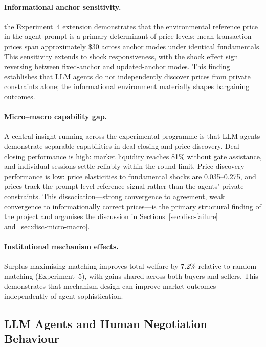 \paragraph{Informational anchor sensitivity.}
the Experiment~4 extension demonstrates that the environmental reference price in the agent prompt is a primary determinant of price levels: mean transaction prices span approximately \$30 across anchor modes under identical fundamentals.  This sensitivity extends to shock responsiveness, with the shock effect sign reversing between fixed-anchor and updated-anchor modes.  This finding establishes that LLM agents do not independently discover prices from private constraints alone; the informational environment materially shapes bargaining outcomes.

\paragraph{Micro--macro capability gap.}
A central insight running across the experimental programme is that LLM agents demonstrate separable capabilities in deal-closing and price-discovery.  Deal-closing performance is high: market liquidity reaches 81\% without gate assistance, and individual sessions settle reliably within the round limit.  Price-discovery performance is low: price elasticities to fundamental shocks are 0.035--0.275, and prices track the prompt-level reference signal rather than the agents' private constraints.  This dissociation---strong convergence to agreement, weak convergence to informationally correct prices---is the primary structural finding of the project and organises the discussion in Sections~\ref{sec:disc-failure} and~\ref{sec:disc-micro-macro}.

\paragraph{Institutional mechanism effects.}
Surplus-maximising matching improves total welfare by 7.2\% relative to random matching (Experiment~5), with gains shared across both buyers and sellers.  This demonstrates that mechanism design can improve market outcomes independently of agent sophistication.

\subsection{LLM Agents and Human Negotiation Behaviour}
\label{sec:disc-human}

